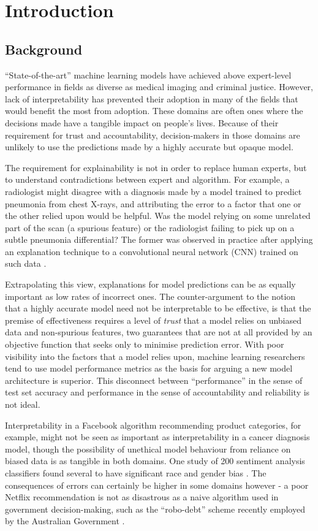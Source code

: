 \documentclass[main]{subfiles}
\begin{document}
\chapter{Introduction}

\section{Background}

``State-of-the-art'' machine learning models have achieved above expert-level performance in fields as diverse as medical imaging and criminal justice. However, lack of interpretability has prevented their adoption in many of the fields that would benefit the most from adoption. These domains are often ones where the decisions made have a tangible impact on people's lives. Because of their requirement for trust and accountability, decision-makers in those domains are unlikely to use the predictions made by a highly accurate but opaque model. 

The requirement for explainability is not in order to replace human experts, but to understand contradictions between expert and algorithm. For example, a radiologist might disagree with a diagnosis made by a model trained to predict pneumonia from chest X-rays, and attributing the error to a factor that one or the other relied upon would be helpful. Was the model relying on some unrelated part of the scan (a spurious feature) or the radiologist failing to pick up on a subtle pneumonia differential? The former was observed in practice after applying an explanation technique to a convolutional neural network (CNN) trained on such data \cite{xray}. 

Extrapolating this view, explanations for model predictions can be as equally important as low rates of incorrect ones. The counter-argument to the notion that a highly accurate model need not be interpretable to be effective, is that the premise of effectiveness requires a level of \textit{trust} that a model relies on unbiased data and non-spurious features, two guarantees that are not at all provided by an objective function that seeks only to minimise prediction error. With poor visibility into the factors that a model relies upon, machine learning researchers tend to use model performance metrics as the basis for arguing a new model architecture is superior. This disconnect between ``performance'' in the sense of test set accuracy and performance in the sense of accountability and reliability is not ideal.

Interpretability in a Facebook algorithm recommending product categories, for example, might not be seen as important as interpretability in a cancer diagnosis model, though the possibility of unethical model behaviour from reliance on biased data is as tangible in both domains. One study of 200 sentiment analysis classifiers found several to have significant race and gender bias \cite{bias}. The consequences of errors can certainly be higher in some domains however - a poor Netflix recommendation is not as disastrous as a naive algorithm used in government decision-making, such as the ``robo-debt'' scheme recently employed by the Australian Government \cite{nous}.
\end{document}
